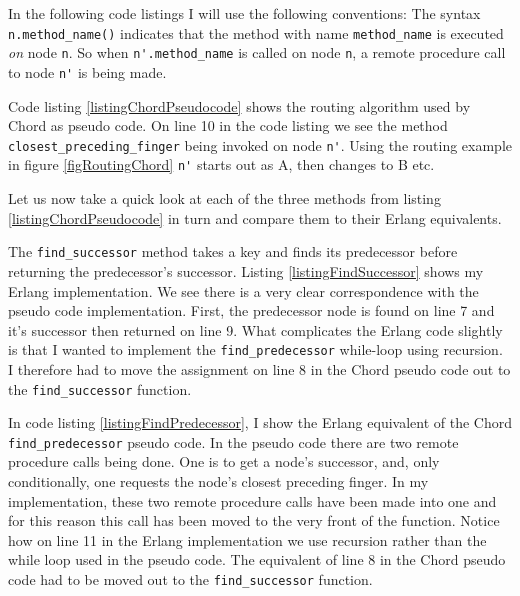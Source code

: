 In the following code listings I will use the following conventions:
The syntax \verb=n.method_name()= indicates that the method with name \verb=method_name= is executed \emph{on} node \verb=n=. So when \verb=n'.method_name= is called on node \verb=n=, a remote procedure call to node \verb=n'= is being made.

Code listing \ref{listingChordPseudocode} shows the routing algorithm used by Chord as pseudo code. On line 10 in the code listing we see the method \verb=closest_preceding_finger= being invoked on node \verb=n'=. Using the routing example in figure \ref{figRoutingChord} \verb=n'= starts out as A, then changes to B etc.



Let us now take a quick look at each of the three methods from listing \ref{listingChordPseudocode} in turn and compare them to their Erlang equivalents.

The \verb=find_successor= method takes a key and finds its predecessor before returning the predecessor's successor.
Listing \ref{listingFindSuccessor} shows my Erlang implementation.
We see there is a very clear correspondence with the pseudo code implementation. First, the predecessor node is found on line 7 and it's successor then returned on line 9.
What complicates the Erlang code slightly is that I wanted to implement the \verb=find_predecessor= while-loop using recursion. I therefore had to move the assignment on line 8 in the Chord pseudo code out to the \verb=find_successor= function.



In code listing \ref{listingFindPredecessor}, I show the Erlang equivalent of the Chord \verb=find_predecessor= pseudo code. 
In the pseudo code there are two remote procedure calls being done. One is to get a node's successor, and, only conditionally, one requests the node's closest preceding finger.
In my implementation, these two remote procedure calls have been made into one and for this reason this call has been moved to the very front of the function.
Notice how on line 11 in the Erlang implementation we use recursion rather than the while loop used in the pseudo code. The equivalent of line 8 in the Chord pseudo code had to be moved out to the \verb=find_successor= function.



